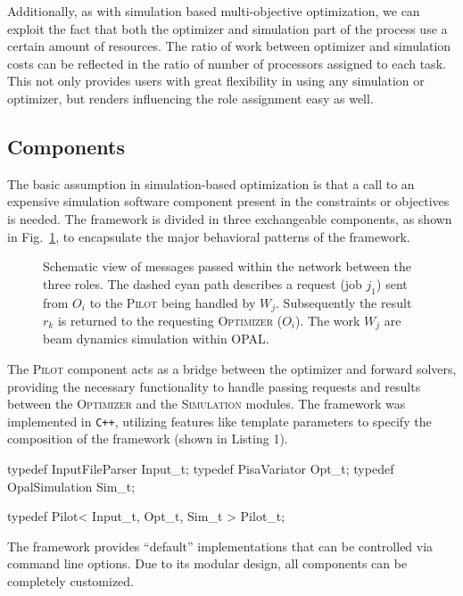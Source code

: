 \documentclass[%
preprint,
preprint,
linenumbers,
amsmath,amssymb,
aps,
prstab,
]{revtex4-1}
\begin{document}
Additionally, as with simulation based multi-objective optimization, we can
  exploit the fact that both the optimizer and simulation part of the process
  use a certain amount of resources.
The ratio of work between optimizer and simulation costs can be reflected in
  the ratio of number of processors assigned to each task.
This not only provides users with  great flexibility in using any simulation
  or optimizer, but renders influencing the role assignment easy as well.


\subsection{Components}

The basic assumption in simulation-based optimization is that a
  call to an expensive simulation software component present in the
  constraints or objectives is needed.
The framework is divided in three exchangeable components, as shown in
  Fig.~\ref{fig:opt-framework-layout}, to encapsulate the major behavioral
  patterns of the framework.
%
\begin{figure}
  \centering
  \scalebox{0.85}{
  \begin{tikzpicture}[text=black]
  
  \end{tikzpicture}
}
  

  \caption{Schematic view of messages passed within the network between the
    three roles.
  The dashed cyan path describes a request (job $j_1$) sent from $O_i$ to the
  \textsc{Pilot} being handled by $W_j$. Subsequently the result $r_k$ is
  returned to the requesting \textsc{Optimizer} ($O_i$). The work $W_j$ are beam dynamics 
  simulation within OPAL.}
  \label{fig:opt-framework-layout}
\end{figure}

%
The \textsc{Pilot} component acts as a bridge between the optimizer and
  forward solvers, providing the necessary functionality to handle passing
  requests and results between the \textsc{Optimizer} and the
  \textsc{Simulation} modules.
The framework was implemented in \texttt{C++}, utilizing features like template
  parameters to specify the composition of the framework (shown in Listing 1).

\begin{code}
typedef InputFileParser	Input_t;
typedef PisaVariator	Opt_t;
typedef OpalSimulation	Sim_t;

typedef Pilot< Input_t, Opt_t, Sim_t > Pilot_t;
\end{code}
The framework provides ``default'' implementations that can be controlled via
  command line options.
Due to its modular design, all components can be completely customized.
\end{document}
